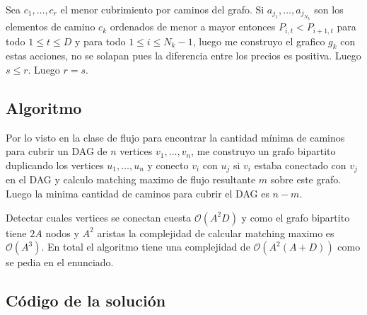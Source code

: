 	Sea $c_1,\dots ,c_r$ el menor cubrimiento por caminos del
	grafo. Si $a_{j_1},\dots ,a_{j_{N_k}}$ son los elementos de
	camino $c_k$ ordenados de menor a mayor entonces $P_{i,t}<P_{i+1,t}$
	para todo $1\leq t\leq D$ y para todo $1\leq i\leq N_k-1$, 
	luego me construyo el grafico $g_k$ con estas acciones, no se
	solapan pues la diferencia entre los precios es positiva.
	Luego $s\leq r$.
	Luego $r=s$.
	
\subsection{Algoritmo}
	Por lo visto en la clase de flujo para encontrar la cantidad mínima 
	de caminos para cubrir un DAG de $n$ vertices
	$v_1,\dots ,v_n$, me construyo un grafo bipartito duplicando los vertices
	$u_1,\dots ,u_n$ y conecto $v_i$ con $u_j$ si $v_i$ estaba conectado con 
	$v_j$ en el DAG y calculo matching maximo de flujo resultante $m$ sobre este grafo. Luego
	la minima cantidad de caminos para cubrir el DAG es $n-m$.
	
	
	Detectar cuales vertices se conectan cuesta $\mathcal{O}(A^2D)$ y como el grafo
	bipartito tiene $2A$ nodos y $A^2$ aristas la complejidad de 
	calcular matching maximo es $\mathcal{O}(A^3)$.
	En total el algoritmo tiene una complejidad de $\mathcal{O}(A^2(A+D))$ como
	se pedia en el enunciado.
\newpage
\subsection{Código de la solución}
% 
